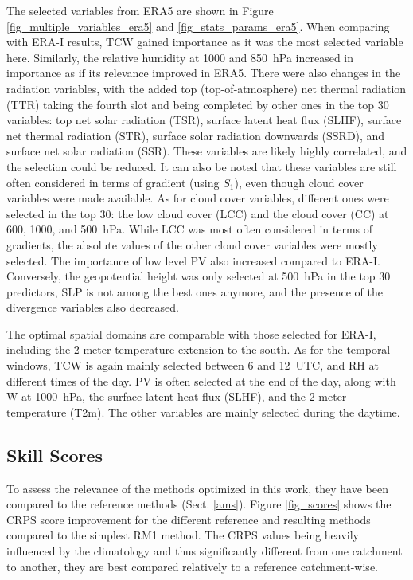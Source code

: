 \documentclass[draft]{agujournal2019}
\begin{document}
The selected variables from ERA5 are shown in Figure \ref{fig_multiple_variables_era5} and \ref{fig_stats_params_era5}. When comparing with ERA-I results, TCW gained importance as it was the most selected variable here. Similarly, the relative humidity at 1000 and 850~hPa increased in importance as if its relevance improved in ERA5. There were also changes in the radiation variables, with the added top (top-of-atmosphere) net thermal radiation (TTR) taking the fourth slot and being completed by other ones in the top 30 variables: top net solar radiation (TSR), surface latent heat flux (SLHF), surface net thermal radiation (STR), surface solar radiation downwards (SSRD), and surface net solar radiation (SSR). These variables are likely highly correlated, and the selection could be reduced. It can also be noted that these variables are still often considered in terms of gradient (using $S_{1}$), even though cloud cover variables were made available. As for cloud cover variables, different ones were selected in the top 30: the low cloud cover (LCC) and the cloud cover (CC) at 600, 1000, and 500~hPa. While LCC was most often considered in terms of gradients, the absolute values of the other cloud cover variables were mostly selected. The importance of low level PV also increased compared to ERA-I. Conversely, the geopotential height was only selected at 500~hPa in the top 30 predictors, SLP is not among the best ones anymore, and the presence of the divergence variables also decreased.

The optimal spatial domains are comparable with those selected for ERA-I, including the 2-meter temperature extension to the south. As for the temporal windows, TCW is again mainly selected between 6 and 12~UTC, and RH at different times of the day. PV is often selected at the end of the day, along with W at 1000~hPa, the surface latent heat flux (SLHF), and the 2-meter temperature (T2m). The other variables are mainly selected during the daytime.


\subsection{Skill Scores}
\label{skill_score}

To assess the relevance of the methods optimized in this work, they have been compared to the reference methods (Sect. \ref{ams}). Figure \ref{fig_scores} shows the CRPS score improvement for the different reference and resulting methods compared to the simplest RM1 method. The CRPS values being heavily influenced by the climatology and thus significantly different from one catchment to another, they are best compared relatively to a reference catchment-wise.
\end{document}
